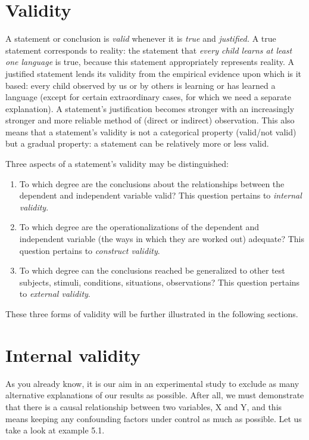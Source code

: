 \documentclass[
]{book}
\begin{document}
\hypertarget{sec:validity}{%
\section{Validity}\label{sec:validity}}

A statement or conclusion is \emph{valid} whenever it is \emph{true} and \emph{justified.} A true statement corresponds to reality: the statement that \emph{every child learns at least one language} is true, because this statement appropriately represents reality. A justified statement lends its validity from the empirical evidence upon which is it based: every child observed by us or by others is learning or has learned a language (except for certain extraordinary cases, for which we need a separate explanation). A statement's justification becomes stronger with an increasingly stronger and more reliable method of (direct or indirect) observation. This also means that a statement's validity is not a categorical property (valid/not valid) but a gradual property: a statement can be relatively more or less valid.

Three aspects of a statement's validity may be distinguished:

\begin{enumerate}
\def\labelenumi{\arabic{enumi}.}
\item
  To which degree are the conclusions about the relationships between the dependent and independent variable valid? This question pertains to \emph{internal validity}.
\item
  To which degree are the operationalizations of the dependent and independent variable (the ways in which they are worked out) adequate? This question pertains to \emph{construct validity}.
\item
  To which degree can the conclusions reached be generalized to other test subjects, stimuli, conditions, situations, observations? This question pertains to \emph{external validity}.
\end{enumerate}

These three forms of validity will be further illustrated in the following sections.

\hypertarget{sec:internalvalidity}{%
\section{Internal validity}\label{sec:internalvalidity}}

As you already know, it is our aim in an experimental study to exclude as many alternative explanations of our results as possible. After all, we must demonstrate that there is a causal relationship between two variables, X and Y, and this means keeping any confounding factors under control as much as possible. Let us take a look at example 5.1.
\end{document}

